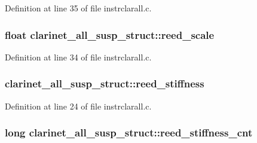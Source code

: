 Definition at line 35 of file instrclarall.\+c.

\subsubsection[{\texorpdfstring{reed\+\_\+scale}{reed_scale}}]{\setlength{\rightskip}{0pt plus 5cm}float clarinet\+\_\+all\+\_\+susp\+\_\+struct\+::reed\+\_\+scale}\hypertarget{structclarinet__all__susp__struct_a8089a29b1fe0f046453af3d93dff562a}{}\label{structclarinet__all__susp__struct_a8089a29b1fe0f046453af3d93dff562a}


Definition at line 34 of file instrclarall.\+c.

\subsubsection[{\texorpdfstring{reed\+\_\+stiffness}{reed_stiffness}}]{ clarinet\+\_\+all\+\_\+susp\+\_\+struct\+::reed\+\_\+stiffness}\hypertarget{structclarinet__all__susp__struct_a54ad7604f2b6c59714669c6bd6060a4e}{}\label{structclarinet__all__susp__struct_a54ad7604f2b6c59714669c6bd6060a4e}


Definition at line 24 of file instrclarall.\+c.

\subsubsection[{\texorpdfstring{reed\+\_\+stiffness\+\_\+cnt}{reed_stiffness_cnt}}]{\setlength{\rightskip}{0pt plus 5cm}long clarinet\+\_\+all\+\_\+susp\+\_\+struct\+::reed\+\_\+stiffness\+\_\+cnt}\hypertarget{structclarinet__all__susp__struct_a7f04ea11755dbcc429d24b2d613b11ef}{}\label{structclarinet__all__susp__struct_a7f04ea11755dbcc429d24b2d613b11ef}


